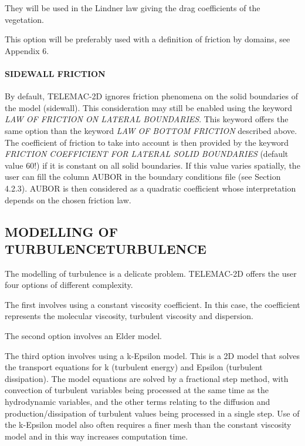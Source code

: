\documentclass{article} %
\begin{document}
 They will be used in the Lindner law giving the drag coefficients of the vegetation.

 This option will be preferably used with a definition of friction by domains, see Appendix 6.


\paragraph{ SIDEWALL FRICTION}

 By default, TELEMAC-2D ignores friction phenomena on the solid boundaries of the model (sidewall). This consideration may still be enabled using the keyword \textit{LAW OF FRICTION ON LATERAL BOUNDARIES}. This keyword offers the same option than the keyword \textit{LAW OF BOTTOM FRICTION} described above. The coefficient of friction to take into account is then provided by the keyword \textit{FRICTION COEFFICIENT FOR LATERAL SOLID BOUNDARIES} (default value 60!) if it is constant on all solid boundaries. If this value varies spatially, the user can fill the column AUBOR in the boundary conditions file (see Section 4.2.3). AUBOR is then considered as a quadratic coefficient whose interpretation depends on the chosen friction law.


\subsection{ MODELLING OF TURBULENCETURBULENCE}

 The modelling of turbulence is a delicate problem. TELEMAC-2D offers the user four options of different complexity.

 The first involves using a constant viscosity coefficient. In this case, the coefficient represents the molecular viscosity, turbulent viscosity and dispersion.

 The second option involves an Elder model.

 The third option involves using a k-Epsilon model. This is a 2D model that solves the transport equations for k (turbulent energy) and Epsilon (turbulent dissipation). The model equations are solved by a fractional step method, with convection of turbulent variables being processed at the same time as the hydrodynamic variables, and the other terms relating to the diffusion and production/dissipation of turbulent values being processed in a single step. Use of the k-Epsilon model also often requires a finer mesh than the constant viscosity model and in this way increases computation time.
\end{document}
